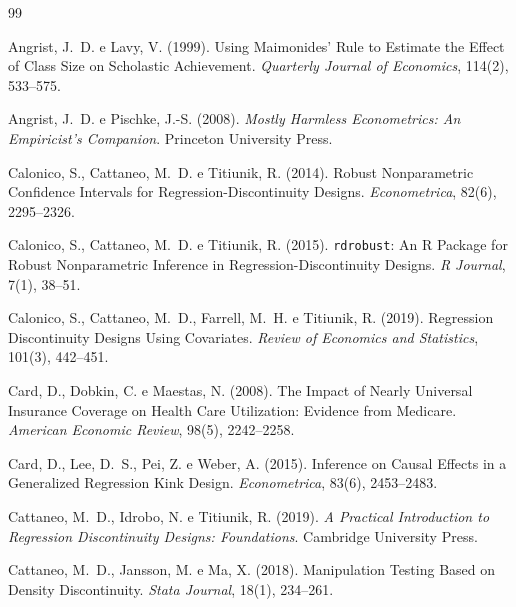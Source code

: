 \documentclass[12pt, a4paper, openany]{book}
\begin{document}
\begin{thebibliography}{99}

Angrist, J.~D. e Lavy, V. (1999).
\newblock Using Maimonides' Rule to Estimate the Effect of Class Size on Scholastic Achievement.
\newblock \textit{Quarterly Journal of Economics}, 114(2), 533--575.

Angrist, J.~D. e Pischke, J.-S. (2008).
\newblock \textit{Mostly Harmless Econometrics: An Empiricist's Companion}.
\newblock Princeton University Press.

Calonico, S., Cattaneo, M.~D. e Titiunik, R. (2014).
\newblock Robust Nonparametric Confidence Intervals for Regression-Discontinuity Designs.
\newblock \textit{Econometrica}, 82(6), 2295--2326.

Calonico, S., Cattaneo, M.~D. e Titiunik, R. (2015).
\newblock \texttt{rdrobust}: An R Package for Robust Nonparametric Inference in Regression-Discontinuity Designs.
\newblock \textit{R Journal}, 7(1), 38--51.

Calonico, S., Cattaneo, M.~D., Farrell, M.~H. e Titiunik, R. (2019).
\newblock Regression Discontinuity Designs Using Covariates.
\newblock \textit{Review of Economics and Statistics}, 101(3), 442--451.

Card, D., Dobkin, C. e Maestas, N. (2008).
\newblock The Impact of Nearly Universal Insurance Coverage on Health Care Utilization: Evidence from Medicare.
\newblock \textit{American Economic Review}, 98(5), 2242--2258.

Card, D., Lee, D.~S., Pei, Z. e Weber, A. (2015).
\newblock Inference on Causal Effects in a Generalized Regression Kink Design.
\newblock \textit{Econometrica}, 83(6), 2453--2483.

Cattaneo, M.~D., Idrobo, N. e Titiunik, R. (2019).
\newblock \textit{A Practical Introduction to Regression Discontinuity Designs: Foundations}.
\newblock Cambridge University Press.

Cattaneo, M.~D., Jansson, M. e Ma, X. (2018).
\newblock Manipulation Testing Based on Density Discontinuity.
\newblock \textit{Stata Journal}, 18(1), 234--261.


\end{thebibliography}
\end{document}
